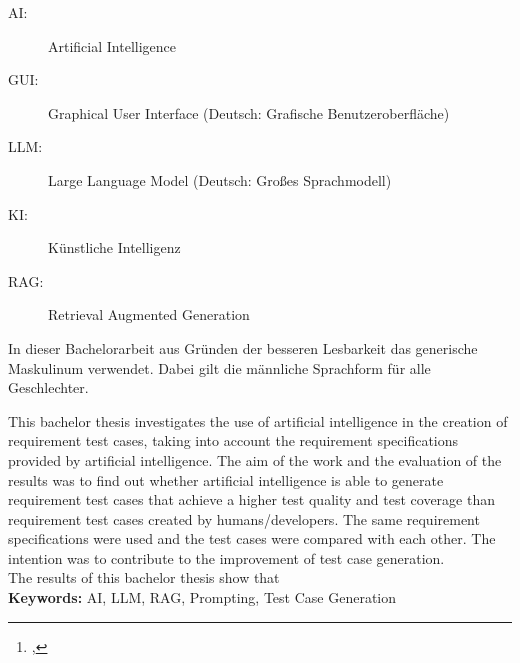 \documentclass[12pt,toc=bib,toc=listof]{scrreprt}
\title{\reprttopic}
\author{\reprtstudentname\footnote{\reprtstudentid, \reprtstudentmail}}
\begin{document}
\maketitle
{}

\tableofcontents

\label{sec:abkuerzungsverzeichnis}

\begin{description}
  \item[AI:] Artificial Intelligence
  \item[GUI:] Graphical User Interface (Deutsch: Grafische Benutzeroberfläche)
  \item[LLM:] Large Language Model (Deutsch: Großes Sprachmodell)
  \item[KI:] Künstliche Intelligenz
  \item[RAG:] Retrieval Augmented Generation
\end{description}

\newpage
\listoffigures
\newpage
{} %
\label{sec:genderHinweis}
In dieser Bachelorarbeit aus Gründen der besseren Lesbarkeit das generische Maskulinum verwendet. Dabei gilt die männliche Sprachform für alle Geschlechter.

\label{sec:abstract}
This bachelor thesis investigates the use of artificial intelligence in the creation of requirement test cases, taking into account the requirement specifications provided by artificial intelligence. The aim of the work and the evaluation of the results was to find out whether artificial intelligence is able to generate requirement test cases that achieve a higher test quality and test coverage than requirement test cases created by humans/developers. The same requirement specifications were used and the test cases were compared with each other. The intention was to contribute to the improvement of test case generation.\\
The results of this bachelor thesis show that
\\
\textbf{Keywords:} AI, LLM, RAG, Prompting, Test Case Generation
\newpage
\end{document}
